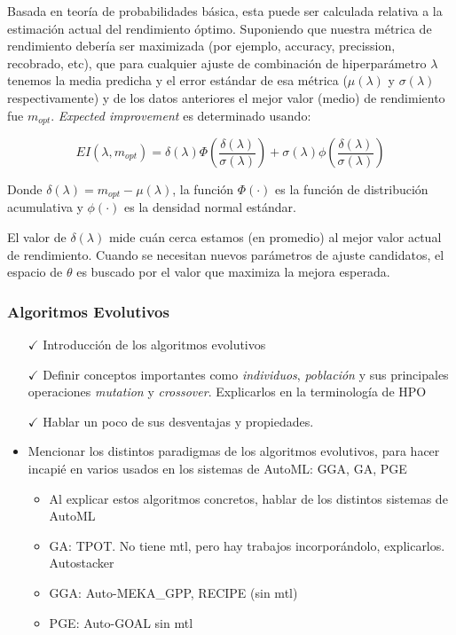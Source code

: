 Basada en teoría de probabilidades básica, esta puede ser calculada relativa a la estimación actual del rendimiento óptimo. Suponiendo que nuestra métrica de rendimiento debería ser maximizada (por ejemplo, accuracy, precission, recobrado, etc), que para cualquier ajuste de combinación de hiperparámetro $\lambda$ tenemos la media predicha y el error estándar de esa métrica ($\mu(\lambda)$ y $\sigma(\lambda)$ respectivamente) y de los datos anteriores el mejor valor (medio) de rendimiento fue $m_{opt}$. \textit{Expected improvement} es determinado usando:

$$
 EI(\lambda, m_{opt}) = \delta(\lambda)\Phi\left(\frac{\delta(\lambda)}{\sigma(\lambda)}\right) + \sigma(\lambda)\phi\left(\frac{\delta(\lambda)}{\sigma(\lambda)} \right)
$$

Donde $\delta(\lambda) = m_{opt} - \mu(\lambda)$, la función  $\Phi(\cdot)$ es la función de distribución acumulativa y $\phi(\cdot)$ es la densidad normal estándar.

El valor de $\delta(\lambda)$ mide cuán cerca estamos (en promedio) al mejor valor actual de rendimiento. Cuando se necesitan nuevos parámetros de ajuste candidatos, el espacio de $\theta$ es buscado por el valor que maximiza la mejora esperada.

\subsubsection{Algoritmos Evolutivos}


\begin{itemize}
	\item[$\checkmark$] Introducción de los algoritmos evolutivos
	\item[$\checkmark$] Definir conceptos importantes como \textit{individuos}, \textit{población} y sus principales operaciones \textit{mutation} y \textit{crossover}. Explicarlos en la terminología de HPO
	\item[$\checkmark$] Hablar un poco de sus desventajas y propiedades.
	\item Mencionar los distintos paradigmas de los algoritmos evolutivos, para hacer incapié en varios usados en los sistemas de AutoML: GGA, GA, PGE
	\begin{itemize}
	\item Al explicar estos algoritmos concretos, hablar de los distintos sistemas de AutoML
	\item GA: TPOT. No tiene mtl, pero hay trabajos incorporándolo, explicarlos. Autostacker
	\item GGA: Auto-MEKA\_GPP, RECIPE (sin mtl)
	\item PGE: Auto-GOAL sin mtl
	\end{itemize}
\end{itemize}

